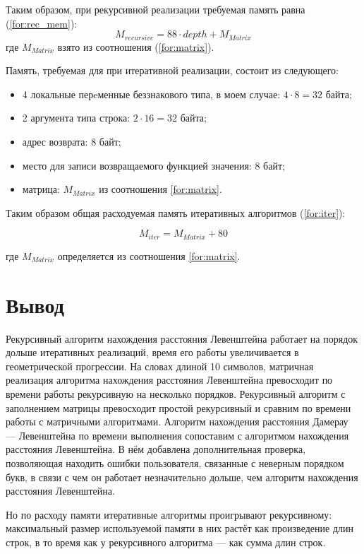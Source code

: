 Таким образом, при рекурсивной реализации требуемая память равна (\ref{for:rec_mem}):
\begin{equation}
M_{recursive} = 88 \cdot depth + M_{Matrix}
\label{for:rec_mem}
\end{equation}
где $M_{Matrix}$ взято из соотношения (\ref{for:matrix}).

Память, требуемая для при итеративной реализации, состоит из следующего:
\begin{itemize}
    \item 4 локальные перeменные беззнакового типа, в моем случае: $4 \cdot 8 = 32$ байта;
    \item 2 аргумента типа строка: $2 \cdot 16 = 32$ байта;
    \item адрес возврата: 8 байт;
    \item место для записи возвращаемого функцией значения: 8 байт;
    \item матрица: $M_{Matrix}$ из соотношения \ref{for:matrix}.
\end{itemize}

Таким образом общая расходуемая память итеративных алгоритмов (\ref{for:iter}):

\begin{equation}
M_{iter} = M_{Matrix} + 80
\label{for:iter}
\end{equation}

где $M_{Matrix}$ определяется из соотношения \ref{for:matrix}.


\section*{Вывод}

Рекурсивный алгоритм нахождения расстояния Левенштейна работает на порядок дольше итеративных реализаций, время его работы увеличивается в геометрической прогрессии. На словах длиной 10 символов, матричная реализация алгоритма нахождения расстояния Левенштейна превосходит по времени работы рекурсивную на несколько порядков. Рекурсивный алгоритм с заполнением матрицы превосходит простой рекурсивный и сравним по времени работы с матричными алгоритмами. Алгоритм нахождения расстояния Дамерау — Левенштейна по времени выполнения сопоставим с алгоритмом нахождения расстояния Левенштейна. В нём добавлена дополнительная проверка, позволяющая находить ошибки пользователя, связанные с неверным порядком букв, в связи с чем он работает незначительно дольше, чем алгоритм нахождения расстояния Левенштейна.

Но по расходу памяти итеративные алгоритмы проигрывают рекурсивному: максимальный размер используемой памяти в них растёт как произведение длин строк, в то время как у рекурсивного алгоритма — как сумма длин строк.
